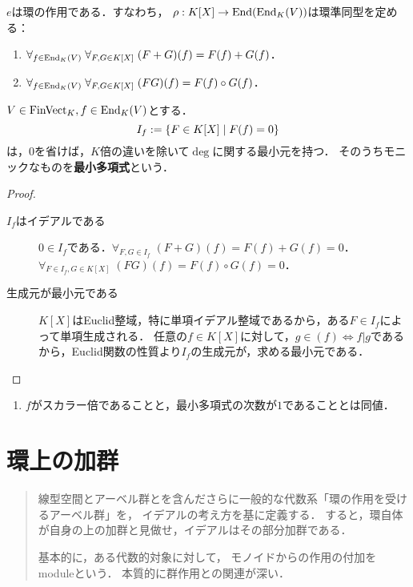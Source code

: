 \documentclass[uplatex,dvipdfmx]{jsreport}
\begin{document}
\begin{proposition}[環の作用]
    $e$は環の作用である．すなわち，
    $\rho:K[X]\to\mathrm{End}(\mathrm{End}_K(V))$は環準同型を定める：
    \begin{enumerate}
        \item $\forall_{f\in\mathrm{End}_K(V)}\;\forall_{F,G\in K[X]}\;(F+G)(f)=F(f)+G(f)$．
        \item $\forall_{f\in\mathrm{End}_K(V)}\;\forall_{F,G\in K[X]}\;(FG)(f)=F(f)\circ G(f)$．
    \end{enumerate}
\end{proposition}

\begin{proposition}
    $V\in\mathrm{FinVect}_K,f\in\mathrm{End}_K(V)$とする．
    \[I_f:=\left\{F\in K[X]\mid F(f)=0\right\}\]
    は，$0$を省けば，$K$倍の違いを除いて$\deg$に関する最小元を持つ．
    そのうちモニックなものを\textbf{最小多項式}という．
\end{proposition}
\begin{proof}\mbox{}
    \begin{description}
        \item[$I_f$はイデアルである] $0\in I_f$である．$\forall_{F,G\in I_f}\;(F+G)(f)=F(f)+G(f)=0$．$\forall_{F\in I_f,G\in K[X]}\;(FG)(f)=F(f)\circ G(f)=0$．
        \item[生成元が最小元である] $K[X]$はEuclid整域，特に単項イデアル整域であるから，ある$F\in I_f$によって単項生成される．
        任意の$f\in K[X]$に対して，$g\in(f)\Leftrightarrow f|g$であるから，Euclid関数の性質より$I_f$の生成元が，求める最小元である．
    \end{description}
\end{proof}

\begin{example}[スカラー倍の最小多項式]\mbox{}
    \begin{enumerate}
        \item $f$がスカラー倍であることと，最小多項式の次数が$1$であることとは同値．
    \end{enumerate}
    
\end{example}

\chapter{環上の加群}

\begin{quotation}
    線型空間とアーベル群とを含んださらに一般的な代数系「環の作用を受けるアーベル群」を，
    イデアルの考え方を基に定義する．
    すると，環自体が自身の上の加群と見做せ，イデアルはその部分加群である．
    
    基本的に，ある代数的対象に対して，
    モノイドからの作用の付加をmoduleという．
    本質的に群作用との関連が深い．
\end{quotation}
\end{document}
